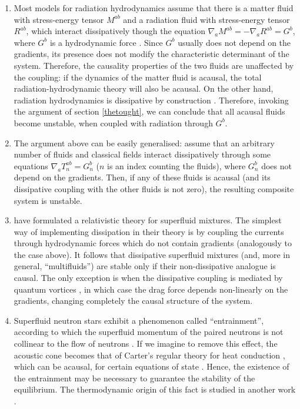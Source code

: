 \documentclass[a4paper, amsfonts, amssymb, amsmath, reprint, showkeys,  twoside, onecolumn,notitlepage,nofootinbib]{revtex4-1}
\theoremstyle{definition}
\theoremstyle{theorem}
\begin{document}
\begin{enumerate}
\item Most models for radiation hydrodynamics assume that there is a matter fluid with stress-energy tensor $M^{ab}$ and a radiation fluid with stress-energy tensor $R^{ab}$, which interact dissipatively though the equation $\nabla_a M^{ab}=-\nabla_a R^{ab}=G^b$, where $G^b$ is a hydrodynamic force \cite{Farris2008,Sadowski2013,GavassinoRadiazione}. Since $G^b$ usually does not depend on the gradients, its presence does not modify the characteristic determinant of the system. Therefore, the causality properties of the two fluids are unaffected by the coupling: if the dynamics of the matter fluid is acausal, the total radiation-hydrodynamic theory will also be acausal. On the other hand, radiation hydrodynamics is dissipative by construction \cite{Weinberg1971,GavassinoRadiazione}. Therefore, invoking the argument of section \ref{thetought}, we can conclude that all acausal fluids become unstable, when coupled with radiation through $G^b$.
\item The argument above can be easily generalised: assume that an arbitrary number of fluids and classical fields interact dissipatively through some equations $\nabla_a T^{ab}_{n}=G_{n}^b$ ($n$ is an index counting the fluids), where $G_{n}^b$ does not depend on the gradients. Then, if any of these fluids is acausal (and its dissipative coupling with the other fluids is not zero), the resulting composite system is unstable.
\item \citet{Carter_starting_point} have formulated a relativistic theory for superfluid mixtures. The simplest way of implementing dissipation in their theory is by coupling the currents through hydrodynamic forces which do not contain gradients \cite{GavassinoUEIT2021} (analogously to the case above). It follows that dissipative superfluid mixtures (and, more in general, ``multifluids'') are stable only if their non-dissipative analogue is causal. The only exception is when the dissipative coupling is mediated by quantum vortices \cite{langlois98,GavassinoIordanskii2021}, in which case the drag force depends non-linearly on the gradients, changing completely the causal structure of the system.
\item Superfluid neutron stars exhibit a phenomenon called ``entrainment'', according to which the superfluid momentum of the paired neutrons is not collinear to the flow of neutrons \cite{prix2004}. If we imagine to remove this effect, the acoustic cone becomes that of Carter's regular theory for heat conduction \cite{noto_rel}, which can be acausal, for certain equations of state \cite{OlsonRegularCarter1990}. Hence, the existence of the entrainment may be necessary to guarantee the stability of the equilibrium. The thermodynamic origin of this fact is studied in another work \cite{GavassinoStabilityCarter2022}.
\end{enumerate} 
\end{document}
